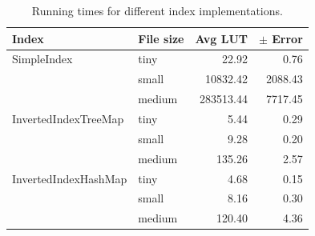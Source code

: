 \begin{table}[t]
\centering
\begin{tabular}{llrr} \toprule
	Index					& File size & Avg LUT 	& $\pm$ Error \\ \midrule
	SimpleIndex				& tiny		& 22.92  	&	 0.76 \\ 
						 	& small		& 10832.42 	&	 2088.43 \\
							& medium 	& 283513.44 & 	 7717.45 \\ \hline
	InvertedIndexTreeMap	& tiny 		& 5.44 		& 	 0.29 \\
							& small 	& 9.28 		& 	 0.20  \\
							& medium 	& 135.26 	& 	 2.57 \\ \hline
	InvertedIndexHashMap	& tiny		& 4.68 		& 	 0.15 \\
							& small		& 8.16 		& 	 0.30 \\
							& medium 	& 120.40 	& 	 4.36 \\ \bottomrule
\end{tabular}
	\caption{Running times for different index implementations.}	
\label{tab:benchmark:indices}
\end{table} 	
